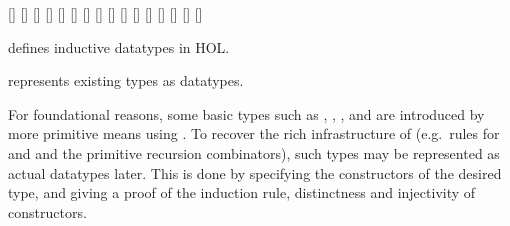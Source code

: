 \begin{isabellebody}
\begin{isamarkuptext}
  \begin{railoutput}
[]
\rail@plus
{}[]
[]
\rail@endplus
\rail@end
{}
[]
\rail@bar
{}
[]
\rail@plus
{}[]
\rail@endplus
{}[]
\rail@endbar
\rail@plus
{}[]
\rail@endplus
\rail@end
{}
[]
\rail@bar
{}
[]
\rail@endbar
{}[]
\rail@plus
{}[]
[]
\rail@endplus
\rail@end
{}
[]
\rail@plus
{}
[]
\rail@endplus
\rail@bar
{}
[]
\rail@endbar
\rail@end
\end{railoutput}


  \begin{description}

  \item \hyperlink{command.HOL.datatype}{\mbox{}} defines inductive datatypes in
  HOL.

  \item \hyperlink{command.HOL.rep-datatype}{\mbox{}} represents existing types as
  datatypes.

  For foundational reasons, some basic types such as , , ,  and  are
  introduced by more primitive means using \hyperlink{command.typedef}{\mbox{}}.  To
  recover the rich infrastructure of \hyperlink{command.datatype}{\mbox{}} (e.g.\ rules
  for \hyperlink{method.cases}{\mbox{}} and \hyperlink{method.induct}{\mbox{}} and the primitive recursion
  combinators), such types may be represented as actual datatypes
  later.  This is done by specifying the constructors of the desired
  type, and giving a proof of the induction rule, distinctness and
  injectivity of constructors.


\end{description}
\end{isamarkuptext}
\end{isabellebody}
